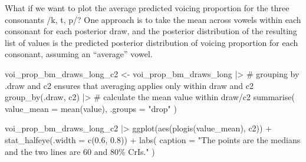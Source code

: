 \documentclass[
  authoryear,
  preprint,
  3p]{elsarticle}
\newenvironment{Shaded}{\begin{snugshade}}{\end{snugshade}}
\newcommand{\AttributeTok}[1]{\textcolor[rgb]{0.40,0.45,0.13}{#1}}
\newcommand{\CommentTok}[1]{\textcolor[rgb]{0.37,0.37,0.37}{#1}}
\newcommand{\FloatTok}[1]{\textcolor[rgb]{0.68,0.00,0.00}{#1}}
\newcommand{\FunctionTok}[1]{\textcolor[rgb]{0.28,0.35,0.67}{#1}}
\newcommand{\NormalTok}[1]{\textcolor[rgb]{0.00,0.23,0.31}{#1}}
\newcommand{\OtherTok}[1]{\textcolor[rgb]{0.00,0.23,0.31}{#1}}
\newcommand{\SpecialCharTok}[1]{\textcolor[rgb]{0.37,0.37,0.37}{#1}}
\newcommand{\StringTok}[1]{\textcolor[rgb]{0.13,0.47,0.30}{#1}}
\begin{document}
What if we want to plot the average predicted voicing proportion for the
three consonants /k, t, p/? One approach is to take the mean across
vowels within each consonant for each posterior draw, and the posterior
distribution of the resulting list of values is the predicted posterior
distribution of voicing proportion for each consonant, assuming an
``average'' vowel.

\begin{Shaded}
\begin{Highlighting}[]
\NormalTok{voi\_prop\_bm\_draws\_long\_c2 }\OtherTok{\textless{}{-}}\NormalTok{ voi\_prop\_bm\_draws\_long }\SpecialCharTok{|\textgreater{}} 
  \CommentTok{\# grouping by .draw and c2 ensures that averaging applies only within draw and c2}
  \FunctionTok{group\_by}\NormalTok{(.draw, c2) }\SpecialCharTok{|\textgreater{}} 
  \CommentTok{\# calculate the mean value within draw/c2}
  \FunctionTok{summarise}\NormalTok{(}
    \AttributeTok{value\_mean =} \FunctionTok{mean}\NormalTok{(value), }\AttributeTok{.groups =} \StringTok{"drop"}
\NormalTok{  )}
\end{Highlighting}
\end{Shaded}

\begin{Shaded}
\begin{Highlighting}[]
\NormalTok{voi\_prop\_bm\_draws\_long\_c2 }\SpecialCharTok{|\textgreater{}} 
  \FunctionTok{ggplot}\NormalTok{(}\FunctionTok{aes}\NormalTok{(}\FunctionTok{plogis}\NormalTok{(value\_mean), c2)) }\SpecialCharTok{+}
  \FunctionTok{stat\_halfeye}\NormalTok{(}\AttributeTok{.width =} \FunctionTok{c}\NormalTok{(}\FloatTok{0.6}\NormalTok{, }\FloatTok{0.8}\NormalTok{)) }\SpecialCharTok{+}
  \FunctionTok{labs}\NormalTok{(}
    \AttributeTok{caption =} \StringTok{"The points are the medians and the two lines are 60 and 80\% CrIs."}
\NormalTok{  )}
\end{Highlighting}
\end{Shaded}
\end{document}
